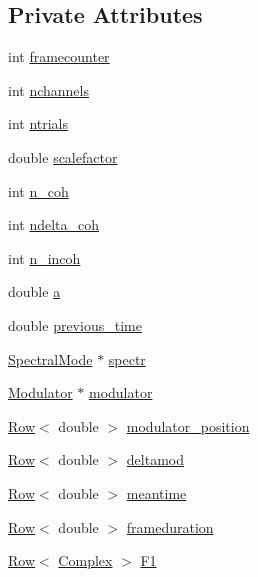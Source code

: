 \subsection*{Private Attributes}
\begin{DoxyCompactItemize}
\item 
int \hyperlink{classFTBasden_ae346f291d45f1d1d99a4f7663c13c2f6}{framecounter}
\item 
int \hyperlink{classFTBasden_a5f79935ce61595d637dc6c05071dbc9c}{nchannels}
\item 
int \hyperlink{classFTBasden_a427aed6fcb0f1e47aa7c3f074e135881}{ntrials}
\item 
double \hyperlink{classFTBasden_a0ce6d1dfd48295970fae36c2fd66c7c0}{scalefactor}
\item 
int \hyperlink{classFTBasden_a73eaee344474c1a9684092fc153c276a}{n\_\-coh}
\item 
int \hyperlink{classFTBasden_ad4f3178302c51d384fd6982291b1c013}{ndelta\_\-coh}
\item 
int \hyperlink{classFTBasden_a08a54e66d27db92948d214db32a271d4}{n\_\-incoh}
\item 
double \hyperlink{classFTBasden_a991d9edce4679a24a08b23de51e070cb}{a}
\item 
double \hyperlink{classFTBasden_ab76d8343edad3ec52f4677b4b0444027}{previous\_\-time}
\item 
\hyperlink{classSpectralMode}{SpectralMode} $\ast$ \hyperlink{classFTBasden_aed5e060486471328c4b0cb30b828d242}{spectr}
\item 
\hyperlink{classModulator}{Modulator} $\ast$ \hyperlink{classFTBasden_a1042a3192c3eeedb17421dea33637fc2}{modulator}
\item 
\hyperlink{classRow}{Row}$<$ double $>$ \hyperlink{classFTBasden_a3c5201a3b733632396c088c037dfb452}{modulator\_\-position}
\item 
\hyperlink{classRow}{Row}$<$ double $>$ \hyperlink{classFTBasden_a8613c1a7437bdd9f42b8bd4565a3c625}{deltamod}
\item 
\hyperlink{classRow}{Row}$<$ double $>$ \hyperlink{classFTBasden_a185b651a1ce01fbe60e51ce748b07899}{meantime}
\item 
\hyperlink{classRow}{Row}$<$ double $>$ \hyperlink{classFTBasden_a5ccd0ee80c5cb01a9538bd72e6079af4}{frameduration}
\item 
\hyperlink{classRow}{Row}$<$ \hyperlink{Matrix_8h_a37333e1628babc1863d6963489e5e9ea}{Complex} $>$ \hyperlink{classFTBasden_aabfa0e2dc66143dfdf26316c1b545eef}{F1}
\item 

\end{DoxyCompactItemize}
